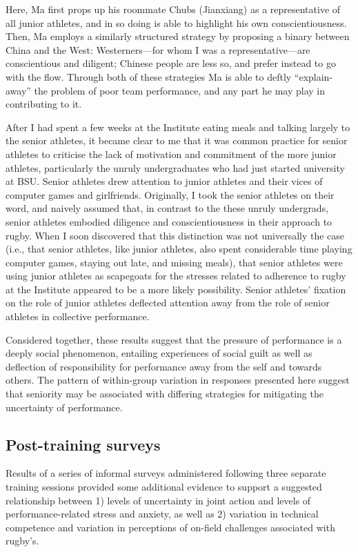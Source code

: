 \begin{CJK}{UTF8}{gbsn}
Here, Ma first props up his roommate Chubs (Jianxiang) as a representative of all junior athletes, and in so doing is able to highlight his own conscientiousness.  Then, Ma employs a similarly structured strategy by proposing a binary between China and the West: Westerners---for whom I was a representative---are conscientious and diligent; Chinese people are less so, and prefer instead to go with the flow.  Through both of these strategies Ma is able to deftly ``explain-away'' the problem of poor team performance, and any part he may play in contributing to it.

After I had spent a few weeks at the Institute eating meals and talking largely to the senior athletes, it became clear to me that it was common practice for senior athletes to criticise the lack of motivation and commitment of the more junior athletes, particularly the unruly undergraduates who had just started university at BSU.  Senior athletes drew attention to junior athletes and their vices of computer games and girlfriends.  Originally, I took the senior athletes on their word, and naively assumed that, in contrast to the these unruly undergrads, senior athletes embodied diligence and conscientiousness in their approach to rugby.  When I soon discovered that this distinction was not universally the case (i.e., that senior athletes, like junior athletes, also spent considerable time playing computer games, staying out late, and missing meals), that senior athletes were using junior athletes as scapegoats for the stresses related to adherence to rugby at the Institute appeared to be a more likely possibility.  Senior athletes' fixation on the role of junior athletes deflected attention away from the role of senior athletes in collective performance.

Considered together, these results suggest that the pressure of performance is a deeply social phenomenon, entailing experiences of social guilt as well as deflection of responsibility for performance away from the self and towards others.  The pattern of within-group variation in responses presented here suggest that seniority may be associated with differing strategies for mitigating the uncertainty of performance.



\subsection{Post-training surveys\label{sect:postTrainingSurvey}}
Results of a series of informal surveys administered following three separate training sessions provided some additional evidence to support a suggested relationship between 1) levels of uncertainty in joint action and levels of performance-related stress and anxiety, as well as 2) variation in technical competence and variation in perceptions of on-field challenges associated with rugby's.


\end{CJK}
